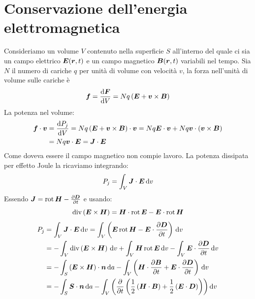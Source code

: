 \section{Conservazione dell'energia elettromagnetica}
Consideriamo un volume $V$ contenuto nella superficie $S$ all'interno del quale ci sia un campo elettrico $\boldsymbol{E}(\boldsymbol{r},t)$ e un campo magnetico $\boldsymbol{B}(\boldsymbol{r},t)$ variabili nel tempo. Sia $N$ il numero di cariche $q$ per unità di volume con velocità $v$, la forza nell'unità di volume sulle cariche è 
\begin{equation}
\boldsymbol{f}=\frac{\mathrm{d}\boldsymbol{F}}{\mathrm{d} V}=Nq\left(\boldsymbol{E}+\boldsymbol{v}\times\boldsymbol{B}\right)
\end{equation}
La potenza nel volume:
\begin{equation}
\begin{split}
\boldsymbol{f}\cdot\boldsymbol{v}&=\frac{\mathrm{d} P_j}{\mathrm{d} V}=Nq\left(\boldsymbol{E}+\boldsymbol{v}\times\boldsymbol{B}\right)\cdot\boldsymbol{v}=Nq\boldsymbol{E}\cdot\boldsymbol{v}+Nq\boldsymbol{v}\cdot\left(\boldsymbol{v}\times\boldsymbol{B}\right)\\
&=Nq\boldsymbol{v}\cdot\boldsymbol{E}=\boldsymbol{J}\cdot\boldsymbol{E}
\end{split}
\end{equation}
Come doveva essere il campo magnetico non compie lavoro. La potenza dissipata per effetto Joule la ricaviamo integrando:
\begin{equation}
P_j=\int_V\boldsymbol{J}\cdot\boldsymbol{E}\,\mathrm{d} v
\end{equation}
Essendo $\boldsymbol{J}=\operatorname{rot}\boldsymbol{H}-\frac{\partial\boldsymbol{D}}{\partial t}$ e usando:
\begin{equation}
\operatorname{div}\left(\boldsymbol{E}\times\boldsymbol{H}\right)=\boldsymbol{H}\cdot\operatorname{rot}\boldsymbol{E}-\boldsymbol{E}\cdot\operatorname{rot}\boldsymbol{H}
\end{equation}
\begin{equation}
\begin{split}
P_j&=\int_V\boldsymbol{J}\cdot\boldsymbol{E}\,\mathrm{d} v=\int_V\left(\boldsymbol{E}\operatorname{rot}\boldsymbol{H}-\boldsymbol{E}\cdot\frac{\partial\boldsymbol{D}}{\partial t}\right)\,\mathrm{d} v\\
&=-\int_V\operatorname{div}\left(\boldsymbol{E}\times\boldsymbol{H}\right)\,\mathrm{d} v+\int_V\boldsymbol{H}\operatorname{rot}\boldsymbol{E}\,\mathrm{d} v-\int_V\boldsymbol{E}\cdot\frac{\partial\boldsymbol{D}}{\partial t}\,\mathrm{d} v\\
&=-\int_S\left(\boldsymbol{E}\times\boldsymbol{H}\right)\cdot\boldsymbol{n}\,\mathrm{d} a-\int_V\left(\boldsymbol{H}\cdot\frac{\partial\boldsymbol{B}}{\partial t}+\boldsymbol{E}\cdot\frac{\partial\boldsymbol{D}}{\partial t}\right)\,\mathrm{d} v\\
&=-\int_S \boldsymbol{S}\cdot\boldsymbol{n}\,\mathrm{d} a-\int_V\left(\frac{\partial}{\partial t}\left(\frac{1}{2}\left(\boldsymbol{H}\cdot\boldsymbol{B}\right)+\frac{1}{2}\left(\boldsymbol{E}\cdot\boldsymbol{D}\right)\right)\right)\mathrm{d} v
\end{split}
\end{equation}
